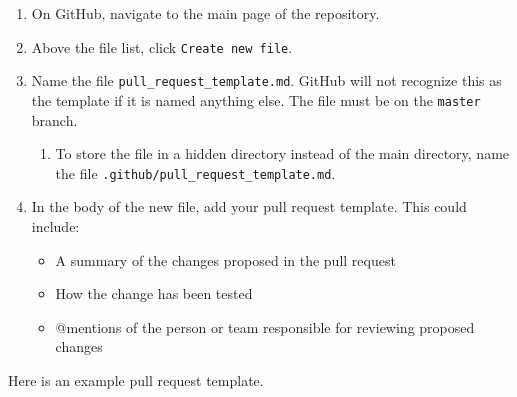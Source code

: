\documentclass[]{book}
\providecommand{\tightlist}{%
  \setlength{\itemsep}{0pt}\setlength{\parskip}{0pt}}
\begin{document}
\begin{enumerate}
\def\labelenumi{\arabic{enumi}.}
\tightlist
\item
  On GitHub, navigate to the main page of the repository.
\item
  Above the file list, click \texttt{Create\ new\ file}.
\item
  Name the file \texttt{pull\_request\_template.md}. GitHub will not
  recognize this as the template if it is named anything else. The file
  must be on the \texttt{master} branch.

  \begin{enumerate}
  \def\labelenumii{\arabic{enumii}.}
  \tightlist
  \item
    To store the file in a hidden directory instead of the main
    directory, name the file
    \texttt{.github/pull\_request\_template.md}.
  \end{enumerate}
\item
  In the body of the new file, add your pull request template. This
  could include:

  \begin{itemize}
  \tightlist
  \item
    A summary of the changes proposed in the pull request
  \item
    How the change has been tested
  \item
    @mentions of the person or team responsible for reviewing proposed
    changes
  \end{itemize}
\end{enumerate}

Here is an example pull request template.
\end{document}
